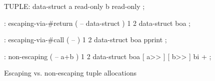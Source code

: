 \centering

  \begin{factorcode}
    TUPLE: data-struct
        { a read-only }
        { b read-only } ;

    : escaping-via-#return ( -- data-struct )
        1 2 data-struct boa ;

    : escaping-via-#call ( -- )
        1 2 data-struct boa pprint ;

    : non-escaping ( -- a+b )
        1 2 data-struct boa [ a>> ] [ b>> ] bi + ;
  \end{factorcode}

\caption{Escaping vs. non-escaping tuple allocations}
